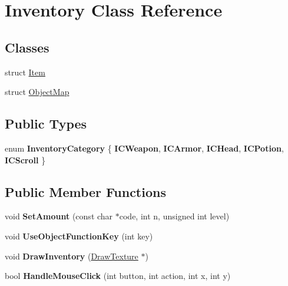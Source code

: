 \hypertarget{classInventory}{\section{\-Inventory \-Class \-Reference}
\label{classInventory}
}
\subsection*{\-Classes}
\begin{DoxyCompactItemize}
\item 
struct \hyperlink{structInventory_1_1Item}{\-Item}
\item 
struct \hyperlink{structInventory_1_1ObjectMap}{\-Object\-Map}
\end{DoxyCompactItemize}
\subsection*{\-Public \-Types}
\begin{DoxyCompactItemize}
\item 
enum {\bfseries \-Inventory\-Category} \{ \*
{\bfseries \-I\-C\-Weapon}, 
{\bfseries \-I\-C\-Armor}, 
{\bfseries \-I\-C\-Head}, 
{\bfseries \-I\-C\-Potion}, 
\*
{\bfseries \-I\-C\-Scroll}
 \}
\end{DoxyCompactItemize}
\subsection*{\-Public \-Member \-Functions}
\begin{DoxyCompactItemize}
\item 
\hypertarget{classInventory_ae1fb50b13e7c77c013a5e5d33c25dc7b}{void {\bfseries \-Set\-Amount} (const char $\ast$code, int n, unsigned int level)}\label{classInventory_ae1fb50b13e7c77c013a5e5d33c25dc7b}

\item 
\hypertarget{classInventory_a05086afa8036eba693188c24427a22cb}{void {\bfseries \-Use\-Object\-Function\-Key} (int key)}\label{classInventory_a05086afa8036eba693188c24427a22cb}

\item 
\hypertarget{classInventory_a5b0e6e05d4772c5dd59dde03e501ac6c}{void {\bfseries \-Draw\-Inventory} (\hyperlink{classDrawTexture}{\-Draw\-Texture} $\ast$)}\label{classInventory_a5b0e6e05d4772c5dd59dde03e501ac6c}

\item 
\hypertarget{classInventory_a325c821071b811851c0cbdb92f35eafa}{bool {\bfseries \-Handle\-Mouse\-Click} (int button, int action, int x, int y)}\label{classInventory_a325c821071b811851c0cbdb92f35eafa}

\end{DoxyCompactItemize}
